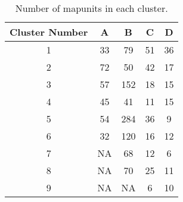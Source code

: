 	\begin{table}[h!]
	\caption{Number of mapunits in each cluster.}
	\centering
		\begin{tabular}{c c c c c}
			\hline 
			Cluster Number	 & 	A	 & 	B	 & 	C	 & 	D \\
			\hline \hline
			1 & 33	& 79	& 51	& 36  \\
			2 & 72	& 50	& 42	& 17  \\
			3 & 57	& 152	& 18	& 15  \\
			4 & 45	& 41	& 11	& 15  \\
			5 & 54	& 284	& 36	& 9   \\
			6 & 32	& 120	& 16	& 12  \\
			7 & NA	& 68	& 12	& 6   \\
			8 & NA	& 70	& 25	& 11  \\
			9 & NA	& NA  	& 6 	& 10  \\
			\hline		
		\end{tabular}
		
		\label{table:soil_clust}
	\end{table}	
	


